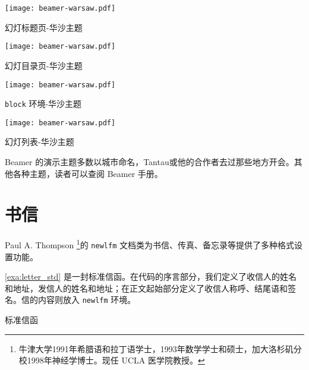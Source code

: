 \begin{example}[htbp]
\begin{Demo}
\centering
\texttt{[image: beamer-warsaw.pdf]}
\end{Demo}
\caption{幻灯标题页-华沙主题}
\label{exa:beamer_title_warsaw}
\end{example}

\begin{example}[!h]
\begin{Demo}
\centering
\texttt{[image: beamer-warsaw.pdf]}
\end{Demo}
\caption{幻灯目录页-华沙主题}
\label{exa:beamer_toc_warsaw}
\end{example}

\begin{example}[htbp]
\begin{Demo}
\centering
\texttt{[image: beamer-warsaw.pdf]}
\end{Demo}
\caption{\texttt{block} 环境-华沙主题}
\label{exa:beamer_block_warsaw}
\end{example}

\begin{example}[!h]
\begin{Demo}
\centering
\texttt{[image: beamer-warsaw.pdf]}
\end{Demo}
\caption{幻灯列表-华沙主题}
\label{exa:beamer_list_warsaw}
\end{example}

Beamer 的演示主题多数以城市命名，Tantau\indexTantau 或他的合作者去过那些地方开会。其他各种主题，读者可以查阅 Beamer 手册。

\section{书信}

Paul A. Thompson\indexThompson{} \footnote{牛津大学1991年希腊语和拉丁语学士，1993年数学学士和硕士，加大洛杉矶分校1998年神经学博士。现任 UCLA 医学院教授。}的 \texttt{newlfm} \citep{Thompson_newlfm}文档类为书信、传真、备忘录等提供了多种格式设置功能。

\autoref{exa:letter_std} 是一封标准信函。在代码的序言部分，我们定义了收信人的姓名和地址，发信人的姓名和地址；在正文起始部分定义了收信人称呼、结尾语和签名。信的内容则放入 \texttt{newlfm} 环境。

\begin{example}[htbp]
\caption{标准信函}
\label{exa:letter_std}
\end{example}

